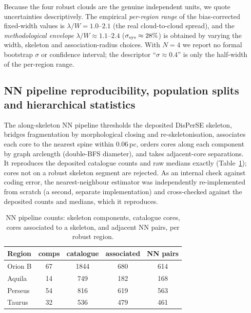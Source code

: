 \documentclass[usenatbib,twoside,twocolumn]{mnras}
\begin{document}
Because the four robust clouds are the genuine independent units, we quote uncertainties descriptively. The empirical \emph{per-region range} of the bias-corrected fixed-width values is $\lambda/W=1.0$--$2.1$ (the real cloud-to-cloud spread), and the \emph{methodological envelope} $\lambda/W\approx1.1$--$2.4$ ($\sigma_{\rm sys}\approx28\%$) is obtained by varying the width, skeleton and association-radius choices. With $N=4$ we report no formal bootstrap $\sigma$ or confidence interval; the descriptor ``$\sigma\approx0.4$'' is only the half-width of the per-region range.

\subsection{NN pipeline reproducibility, population splits and hierarchical statistics}
\label{sec:nnpipeline}

The along-skeleton NN pipeline thresholds the deposited DisPerSE skeleton, bridges fragmentation by morphological closing and re-skeletonisation, associates each core to the nearest spine within $0.06$\,pc, orders cores along each component by graph arclength (double-BFS diameter), and takes adjacent-core separations. It reproduces the deposited catalogue counts and raw medians exactly (Table~\ref{tab:nnpipeline}); cores not on a robust skeleton segment are rejected. As an internal check against coding error, the nearest-neighbour estimator was independently re-implemented from scratch (a second, separate implementation) and cross-checked against the deposited counts and medians, which it reproduces.

\begin{table}
\caption{NN pipeline counts: skeleton components, catalogue cores, cores associated to a skeleton, and adjacent NN pairs, per robust region.}
\label{tab:nnpipeline}
\footnotesize
\setlength{\tabcolsep}{4pt}
\begin{tabular}{lcccc}
\toprule
Region & comps & catalogue & associated & NN pairs \\
\midrule
Orion B & 67 & 1844 & 680 & 614 \\
Aquila  & 14 & 749  & 182 & 168 \\
Perseus & 54 & 816  & 619 & 563 \\
Taurus  & 32 & 536  & 479 & 461 \\
\bottomrule
\end{tabular}
\end{table}
\end{document}
